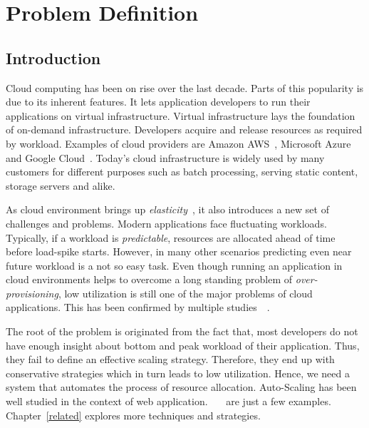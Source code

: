 \chapter{Problem Definition}
\label{prob-def}
\section{Introduction}
Cloud computing has been on rise over the last decade. Parts of this popularity is due to its inherent features. It lets application developers to run their applications on virtual infrastructure. Virtual infrastructure lays the foundation of on-demand infrastructure. Developers acquire and release resources as required by workload. Examples of cloud providers are Amazon AWS~\cite{aws}, Microsoft Azure~\cite{azure} and Google Cloud~\cite{gc}. Today's cloud infrastructure is widely used by many customers for different purposes such as batch processing, serving static content, storage servers and alike.

As cloud environment brings up \emph{elasticity}~\cite{Roman:2013}, it also introduces a new set of challenges and problems. Modern applications face fluctuating workloads. Typically, if a workload is \emph{predictable}, resources are allocated ahead of time before load-spike starts. However, in many other scenarios predicting even near future workload is a not so easy task. Even though running an application in cloud environments helps to overcome a long standing problem of \emph{over-provisioning}, low utilization is still one of the major problems of cloud applications. This has been confirmed by multiple studies~\cite{Delimitrou:2014}~\cite{Reiss:2012}.

The root of the problem is originated from the fact that, most developers do not have enough insight about bottom and peak workload of their application. Thus, they fail to define an effective scaling strategy. Therefore, they end up with conservative strategies which in turn leads to low utilization. Hence, we need a system that automates the process of resource allocation. Auto-Scaling has been well studied in the context of web application.~\cite{Hasan2012IntegratedAA}~\cite{Dutreilh2010}~\cite{Herbst:2013} are just a few examples. Chapter~\ref{related} explores more techniques and strategies.

